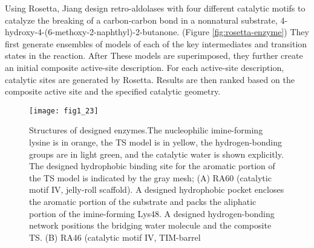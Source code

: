 \begin{refsection}
Using Rosetta, Jiang  design retro-aldolases with four different
catalytic motifs to catalyze the breaking of a carbon-carbon bond in a
nonnatural substrate,
4-hydroxy-4-(6-methoxy-2-naphthyl)-2-butanone\cite{Jiang2008}.  (Figure
\ref{fig:rosetta-enzyme}) They first generate ensembles of models of each of
the key intermediates and transition states in the reaction. After These models
are superimposed, they further create an initial composite active-site
description. For each active-site description, catalytic sites are generated by
Rosetta. Results are then ranked based on the composite active site and the
specified catalytic geometry.
\begin{figure}[h!] \centering \texttt{[image: fig1\_23]}
    \caption[Structures of designed enzymes.The nucleophilic imine-forming
        lysine is in orange, the TS model is in yellow, the hydrogen-bonding
        groups are in light green, and the catalytic water is shown explicitly.
        The designed hydrophobic binding site for the aromatic portion of the
        TS model is indicated by the gray mesh; (A) RA60 (catalytic motif IV,
        jelly-roll scaffold). A designed hydrophobic pocket encloses the
        aromatic portion of the substrate and packs the aliphatic portion of
        the imine-forming Lys48. A designed hydrogen-bonding network positions
        the bridging water molecule and the composite TS. (B) RA46 (catalytic
        motif IV, TIM-barrel scaffold). Tyr83 and Ser210 position the bridging
        water molecule, which facilitates the proton shuffling required in
        active site. (C) RA45 (catalytic motif IV, TIM-barrel scaffold). The
        bridging water is hydrogen-bonded by Ser211 and Glu233; replacing the
    Glu233 with Thr decreases catalytic activity threefold.] {Structures of
        designed enzymes.The nucleophilic imine-forming lysine is in orange,
        the TS model is in yellow, the hydrogen-bonding groups are in light
        green, and the catalytic water is shown explicitly. The designed
        hydrophobic binding site for the aromatic portion of the TS model is
        indicated by the gray mesh; (A) RA60 (catalytic motif IV, jelly-roll
        scaffold). A designed hydrophobic pocket encloses the aromatic portion
        of the substrate and packs the aliphatic portion of the imine-forming
        Lys48. A designed hydrogen-bonding network positions the bridging water
        molecule and the composite TS. (B) RA46 (catalytic motif IV, TIM-barrel
}
\end{figure}
\end{refsection}
